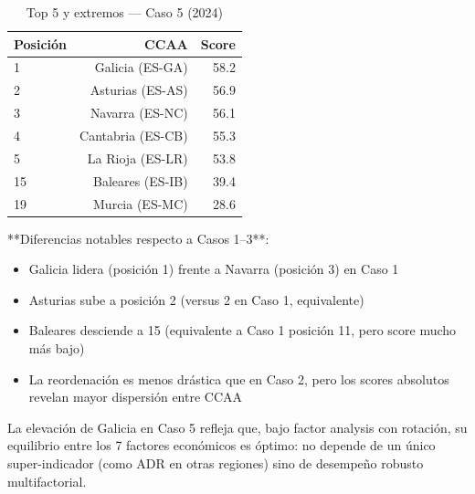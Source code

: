 \begin{table}[H]
    \centering
    \small
    \begin{tabular}{lrr}
        \toprule
        \textbf{Posición} & \textbf{CCAA} & \textbf{Score} \\
        \midrule
        1 & Galicia (ES-GA) & 58.2 \\
        2 & Asturias (ES-AS) & 56.9 \\
        3 & Navarra (ES-NC) & 56.1 \\
        4 & Cantabria (ES-CB) & 55.3 \\
        5 & La Rioja (ES-LR) & 53.8 \\
        \midrule
        15 & Baleares (ES-IB) & 39.4 \\
        19 & Murcia (ES-MC) & 28.6 \\
        \bottomrule
    \end{tabular}
    \caption{Top 5 y extremos — Caso 5 (2024)}
    \label{tab:caso5_2024}
\end{table}

**Diferencias notables respecto a Casos 1--3**:

\begin{itemize}
    \item Galicia lidera (posición 1) frente a Navarra (posición 3) en Caso 1
    \item Asturias sube a posición 2 (versus 2 en Caso 1, equivalente)
    \item Baleares desciende a 15 (equivalente a Caso 1 posición 11, pero score mucho más bajo)
    \item La reordenación es menos drástica que en Caso 2, pero los scores absolutos revelan mayor dispersión entre CCAA
\end{itemize}

La elevación de Galicia en Caso 5 refleja que, bajo factor analysis con rotación, su equilibrio entre los 7 factores económicos es óptimo: no depende de un único super-indicador (como ADR en otras regiones) sino de desempeño robusto multifactorial.

